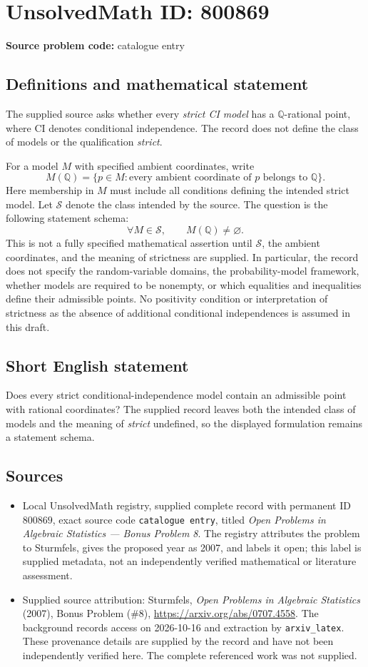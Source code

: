 \documentclass[11pt]{article}
\newcommand{\Q}{\mathbb{Q}}
\begin{document}
\section*{UnsolvedMath ID: 800869}
\textbf{Source problem code:} catalogue entry
\subsection{Definitions and mathematical statement}
The supplied source asks whether every \emph{strict CI model} has a \(\Q\)-rational point, where CI denotes conditional independence. The record does not define the class of models or the qualification \emph{strict}.

For a model \(M\) with specified ambient coordinates, write
\[
M(\Q)=\{p\in M: \text{every ambient coordinate of }p\text{ belongs to }\Q\}.
\]
Here membership in \(M\) must include all conditions defining the intended strict model. Let \(\mathscr S\) denote the class intended by the source. The question is the following statement schema:
\[
\forall M\in\mathscr S,\qquad M(\Q)\ne\varnothing.
\]
This is not a fully specified mathematical assertion until \(\mathscr S\), the ambient coordinates, and the meaning of strictness are supplied. In particular, the record does not specify the random-variable domains, the probability-model framework, whether models are required to be nonempty, or which equalities and inequalities define their admissible points. No positivity condition or interpretation of strictness as the absence of additional conditional independences is assumed in this draft.
\subsection{Short English statement}
Does every strict conditional-independence model contain an admissible point with rational coordinates? The supplied record leaves both the intended class of models and the meaning of \emph{strict} undefined, so the displayed formulation remains a statement schema.
\subsection{Sources}
\begin{itemize}
\item Local UnsolvedMath registry, supplied complete record with permanent ID \(800869\), exact source code \texttt{catalogue entry}, titled \emph{Open Problems in Algebraic Statistics --- Bonus Problem 8}. The registry attributes the problem to Sturmfels, gives the proposed year as 2007, and labels it open; this label is supplied metadata, not an independently verified mathematical or literature assessment.
\item Supplied source attribution: Sturmfels, \emph{Open Problems in Algebraic Statistics} (2007), Bonus Problem (\#8), \url{https://arxiv.org/abs/0707.4558}. The background records access on 2026-10-16 and extraction by \texttt{arxiv\_latex}. These provenance details are supplied by the record and have not been independently verified here. The complete referenced work was not supplied.
\end{itemize}
\end{document}
